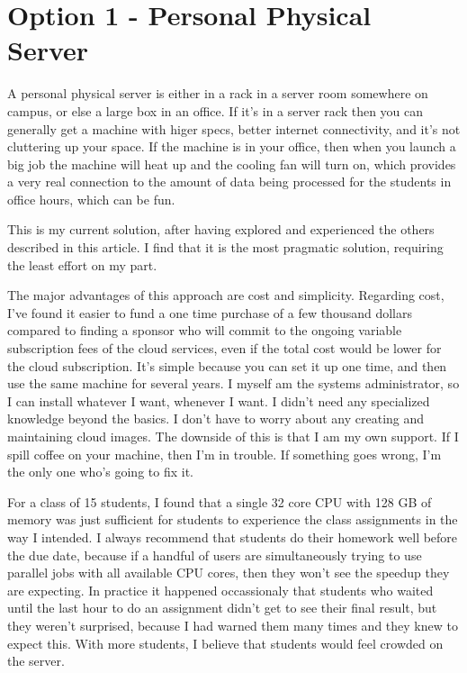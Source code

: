 \documentclass{article}
\begin{document}
\section{Option 1 - Personal Physical Server}

A personal physical server is either in a rack in a server room somewhere on campus, or else a large box in an office.
If it's in a server rack then you can generally get a machine with higer specs, better internet connectivity, and it's not cluttering up your space.
If the machine is in your office, then when you launch a big job the machine will heat up and the cooling fan will turn on, which provides a very real connection to the amount of data being processed for the students in office hours, which can be fun.

This is my current solution, after having explored and experienced the others described in this article.
I find that it is the most pragmatic solution, requiring the least effort on my part.

The major advantages of this approach are cost and simplicity.
Regarding cost, I've found it easier to fund a one time purchase of a few thousand dollars compared to finding a sponsor who will commit to the ongoing variable subscription fees of the cloud services, even if the total cost would be lower for the cloud subscription.
It's simple because you can set it up one time, and then use the same machine for several years.
I myself am the systems administrator, so I can install whatever I want, whenever I want.
I didn't need any specialized knowledge beyond the basics.
I don't have to worry about any creating and maintaining cloud images.
The downside of this is that I am my own support.
If I spill coffee on your machine, then I'm in trouble.
If something goes wrong, I'm the only one who's going to fix it.

For a class of 15 students, I found that a single 32 core CPU with 128 GB of memory was just sufficient for students to experience the class assignments in the way I intended.
I always recommend that students do their homework well before the due date, because if a handful of users are simultaneously trying to use parallel jobs with all available CPU cores, then they won't see the speedup they are expecting.
In practice it happened occassionaly that students who waited until the last hour to do an assignment didn't get to see their final result, but they weren't surprised, because I had warned them many times and they knew to expect this.
With more students, I believe that students would feel crowded on the server.
\end{document}
